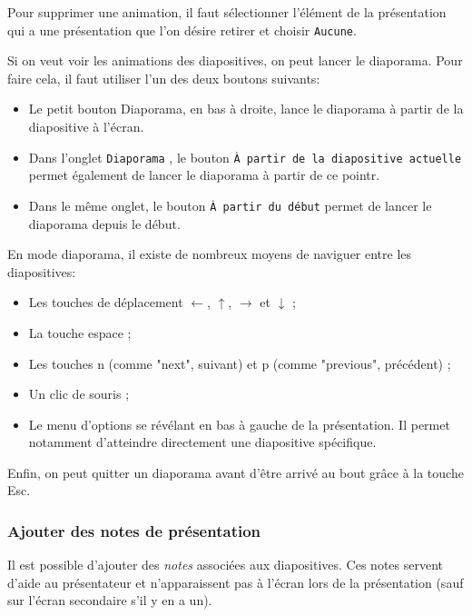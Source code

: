 
Pour supprimer une animation, il faut sélectionner l'élément de la présentation qui a une présentation que l'on désire retirer et choisir \texttt{Aucune}.


Si on veut voir les animations des diapositives, on peut lancer le diaporama. Pour faire cela, il faut utiliser l'un des deux boutons suivants:
\begin{itemize}
	\item Le petit bouton Diaporama, en bas à droite, lance le diaporama à partir de la diapositive à l'écran. 
	\item Dans l'onglet \texttt{Diaporama} , le bouton \texttt{À partir de la diapositive actuelle} permet également de lancer le diaporama à partir de ce pointr. 
	\item Dans le même onglet, le bouton \texttt{À partir du début} permet de lancer le diaporama depuis le début. 
\end{itemize}


En mode diaporama, il existe de nombreux moyens de naviguer entre les diapositives:
\begin{itemize}
	\item Les touches de déplacement $\leftarrow$, $\uparrow$, $\rightarrow$ et $\downarrow$ ;
	\item La touche espace ;
	\item Les touches n (comme "next", suivant) et p (comme "previous", précédent) ;
	\item Un clic de souris ;
	\item Le menu d'options se révélant en bas à gauche de la présentation. Il permet notamment d'atteindre directement une diapositive spécifique.	
\end{itemize}

Enfin, on peut quitter un diaporama avant d'être arrivé au bout grâce à la touche Esc.


\subsubsection{Ajouter des notes de présentation}\label{Presentation1notes}


Il est possible d'ajouter des \emph{\og notes \fg} associées aux diapositives. Ces notes servent d'aide au présentateur et n'apparaissent pas à l'écran lors de la présentation (sauf sur l'écran secondaire s'il y en a un).

